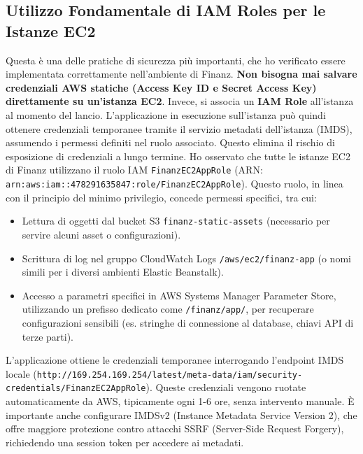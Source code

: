 \subsection{Utilizzo Fondamentale di IAM Roles per le Istanze EC2}
\label{subsec:iam-roles-ec2_cap2}
Questa è una delle pratiche di sicurezza più importanti, che ho verificato essere implementata correttamente nell'ambiente di Finanz. \textbf{Non bisogna mai salvare credenziali AWS statiche (Access Key ID e Secret Access Key) direttamente su un'istanza EC2}. Invece, si associa un \textbf{IAM Role} all'istanza al momento del lancio. L'applicazione in esecuzione sull'istanza può quindi ottenere credenziali temporanee tramite il servizio metadati dell'istanza (IMDS), assumendo i permessi definiti nel ruolo associato. Questo elimina il rischio di esposizione di credenziali a lungo termine.
Ho osservato che tutte le istanze EC2 di Finanz utilizzano il ruolo IAM \texttt{FinanzEC2AppRole} (ARN: \texttt{arn:aws:iam::478291635847:role/FinanzEC2AppRole}). Questo ruolo, in linea con il principio del minimo privilegio, concede permessi specifici, tra cui:
\begin{itemize}
    \item Lettura di oggetti dal bucket S3 \texttt{finanz-static-assets} (necessario per servire alcuni asset o configurazioni).
    \item Scrittura di log nel gruppo CloudWatch Logs \texttt{/aws/ec2/finanz-app} (o nomi simili per i diversi ambienti Elastic Beanstalk).
    \item Accesso a parametri specifici in AWS Systems Manager Parameter Store, utilizzando un prefisso dedicato come \texttt{/finanz/app/}, per recuperare configurazioni sensibili (es. stringhe di connessione al database, chiavi API di terze parti).
\end{itemize}
L'applicazione ottiene le credenziali temporanee interrogando l'endpoint IMDS locale (\texttt{http://169.254.169.254/latest/meta-data/iam/security-credentials/FinanzEC2AppRole}). Queste credenziali vengono ruotate automaticamente da AWS, tipicamente ogni 1-6 ore, senza intervento manuale. È importante anche configurare IMDSv2 (Instance Metadata Service Version 2), che offre maggiore protezione contro attacchi SSRF (Server-Side Request Forgery), richiedendo una session token per accedere ai metadati.

